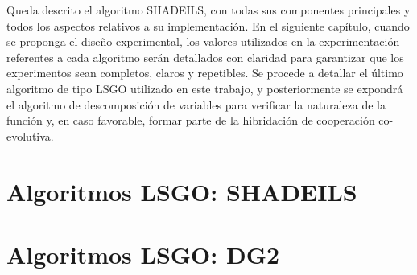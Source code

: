 Queda descrito el algoritmo SHADEILS, con todas sus componentes principales y todos los aspectos relativos a su implementación. En el siguiente capítulo, cuando se proponga el diseño experimental, los valores utilizados en la experimentación referentes a cada algoritmo serán detallados con claridad para garantizar que los experimentos sean completos, claros y repetibles. Se procede a detallar el último algoritmo de tipo LSGO utilizado en este trabajo, y posteriormente se expondrá el algoritmo de descomposición de variables para verificar la naturaleza de la función y, en caso favorable, formar parte de la hibridación de cooperación co-evolutiva.

\section{Algoritmos LSGO: SHADEILS}

\section{Algoritmos LSGO: DG2}



























































